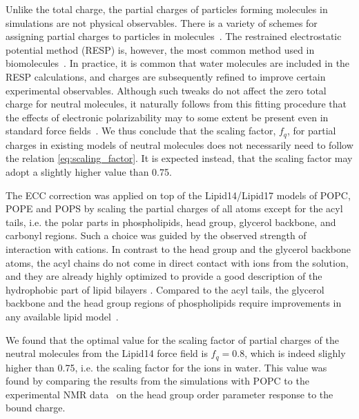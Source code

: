 Unlike the total charge, the partial charges of particles forming molecules in simulations are not physical observables. 
There is a variety of schemes for assigning partial charges to particles in molecules~\citep{Hu2007}. 
The restrained electrostatic potential method (RESP) is, however, the most common method used in biomolecules~\citep{RESP_paper, Singh1984, dickson14}. 
In practice, it is common that water molecules are included in the RESP calculations, 
and charges are subsequently refined to improve certain experimental observables. 
Although such tweaks do not affect the zero total charge for neutral molecules,
it naturally follows from this fitting procedure that the effects of electronic polarizability 
may to some extent be present even in standard force fields~\citep{RESP_paper, Singh1984, jorgensen96, ipolq2013, benavides17}. 
We thus conclude that the scaling factor, $f_q$, for partial charges in existing models of neutral molecules does not necessarily need to follow the relation \ref{eq:scaling_factor}.
It is expected instead, that the scaling factor may adopt a slightly higher value than 0.75. 

The ECC correction was applied on top of the Lipid14/Lipid17 models of POPC, POPE and POPS
by scaling the partial charges of all atoms except for the acyl tails, 
i.e. the polar parts in phospholipids, head group, glycerol backbone, and carbonyl regions. 
Such a choice was guided by the observed strength of interaction with cations. 
In contrast to the head group and the glycerol backbone atoms, 
the acyl chains do not come in direct contact with ions from the solution, 
and they are already highly optimized to provide a good description of the
hydrophobic part of lipid bilayers \cite{dickson14,ollila16}.
Compared to the acyl tails, the glycerol backbone and the head group regions of phospholipids 
require improvements in any available lipid model~\cite{botan15}.

We found that the optimal value for the scaling factor of partial charges of the neutral molecules from the Lipid14 force field \citep{dickson14}
is $f_q = 0.8$, which is indeed slighly higher than 0.75, 
i.e. the scaling factor for the ions in water. 
This value was found by comparing the results from the simulations with POPC to the experimental 
NMR data~\cite{akutsu81,altenbach84,scherer89} on the head group order parameter response to the bound charge.

